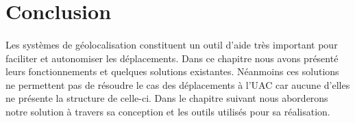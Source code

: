 	  
\section*{Conclusion}
	\paragraph{}
	  Les systèmes de géolocalisation constituent un outil d'aide très important pour faciliter et autonomiser les déplacements. Dans ce chapitre nous avons présenté leurs fonctionnements et quelques solutions existantes. Néanmoins ces solutions ne permettent
	  pas de résoudre le cas des déplacements à l'UAC car aucune d'elles ne présente la structure de celle-ci. Dans le chapitre suivant
	  nous aborderons notre solution à travers sa conception et les outils utilisés pour sa réalisation.